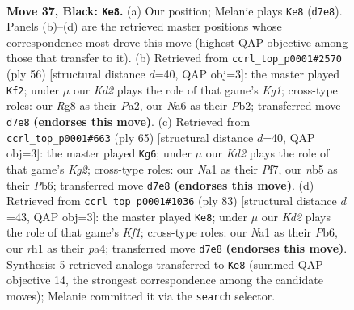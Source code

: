 \documentclass[11pt]{article}
\begin{document}
\clearpage

\begin{figure}[p]\centering
\begin{subfigure}{0.46\textwidth}\centering
\resizebox{\linewidth}{!}{%
\newchessgame
\chessboard[
  setfen={6r1/1p1kp2p/n5p1/pNp5/5P1P/2P2P2/P5K1/n1B4R b - - 0 37},
  showmover=false,
  pgfstyle=straightmove, color=movearrow, markmove={d7-e8}
]}
\caption{}
\end{subfigure}\hfill
\begin{subfigure}{0.46\textwidth}\centering
\resizebox{\linewidth}{!}{%
\newchessgame
\chessboard[
  setfen={5k2/p1Nb1pp1/3P4/1p2r3/2p3p1/8/PPP3PP/3R2K1 w - - 4 29},
  showmover=false,
  pgfstyle=straightmove, color=movearrow, markmove={g1-f2}
]}
\caption{}
\end{subfigure}
\\[4pt]
\begin{subfigure}{0.46\textwidth}\centering
\resizebox{\linewidth}{!}{%
\newchessgame
\chessboard[
  setfen={5r2/2p2pk1/1p6/5np1/p6p/2P2P2/PP1NRKPP/8 b - - 1 33},
  showmover=false,
  pgfstyle=straightmove, color=movearrow, markmove={g7-g6}
]}
\caption{}
\end{subfigure}\hfill
\begin{subfigure}{0.46\textwidth}\centering
\resizebox{\linewidth}{!}{%
\newchessgame
\chessboard[
  setfen={1r3k2/5p2/1p2p1p1/3nP1Pp/P3p3/1P6/3B1PP1/2R2K2 b - - 4 42},
  showmover=false,
  pgfstyle=straightmove, color=movearrow, markmove={f8-e8}
]}
\caption{}
\end{subfigure}
\caption{\textbf{Move 37, Black: \texttt{Ke8}.} (a) Our position; Melanie plays \texttt{Ke8} (\texttt{d7e8}). Panels (b)--(d) are the retrieved master positions whose correspondence most drove this move (highest QAP objective among those that transfer to it). (b) Retrieved from \texttt{ccrl\_top\_p0001\#2570} (ply 56) [structural distance $d$=40, QAP obj=3]: the master played \texttt{Kf2}; under $\mu$ our \emph{Kd2} plays the role of that game's \emph{Kg1}; cross-type roles: our \emph{R}g8 as their \emph{P}a2, our \emph{N}a6 as their \emph{P}b2; transferred move \texttt{d7e8} \textbf{(endorses this move)}. (c) Retrieved from \texttt{ccrl\_top\_p0001\#663} (ply 65) [structural distance $d$=40, QAP obj=3]: the master played \texttt{Kg6}; under $\mu$ our \emph{Kd2} plays the role of that game's \emph{Kg2}; cross-type roles: our \emph{N}a1 as their \emph{P}f7, our \emph{n}b5 as their \emph{P}b6; transferred move \texttt{d7e8} \textbf{(endorses this move)}. (d) Retrieved from \texttt{ccrl\_top\_p0001\#1036} (ply 83) [structural distance $d$=43, QAP obj=3]: the master played \texttt{Ke8}; under $\mu$ our \emph{Kd2} plays the role of that game's \emph{Kf1}; cross-type roles: our \emph{N}a1 as their \emph{P}b6, our \emph{r}h1 as their \emph{p}a4; transferred move \texttt{d7e8} \textbf{(endorses this move)}. Synthesis: 5 retrieved analogs transferred to \texttt{Ke8} (summed QAP objective 14, the strongest correspondence among the candidate moves); Melanie committed it via the \texttt{search} selector.}
\label{fig:thought-m73}
\end{figure}
\end{document}
